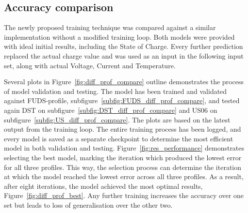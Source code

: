\subsection{Accuracy comparison}
    The newly proposed training technique was compared against a similar implementation without a modified training loop.
    Both models were provided with ideal initial results, including the State of Charge.
    Every further prediction replaced the actual charge value and was used as an input in the following input set, along with actual Voltage, Current and Temperature.
    
    Several plots in \mbox{Figure~\ref{fig:diff_prof_compare}} outline demonstrates the process of model validation and testing.
    The model has been trained and validated against FUDS-profile, \mbox{subfigure~\ref{subfig:FUDS_diff_prof_compare}}, and tested again DST on \mbox{subfigure~\ref{subfig:DST_diff_prof_compare}} and US06 on \mbox{subfigure~\ref{subfig:US_diff_prof_compare}}.
    The plots are based on the latest output from the training loop.
    The entire training process has been logged, and every model is saved as a separate checkpoint to determine the most efficient model in both validation and testing.
    \mbox{Figure~\ref{fig:res_performance}} demonstrates selecting the best model, marking the iteration which produced the lowest error for all three profiles.
    This way, the selection process can determine the iteration at which the model reached the lowest error across all three profiles. 
    As a result, after eight iterations, the model achieved the most optimal results, \mbox{Figure~\ref{fig:diff_prof_best}}.
    Any further training increases the accuracy over one set but leads to loss of generalisation over the other two.

